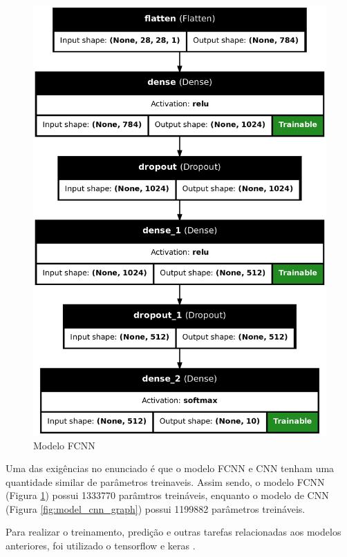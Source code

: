 \documentclass[12pt]{article}
\begin{document}
\begin{figure}[H]
\begin{minipage}{0.4\textwidth}
    \includegraphics[width=\textwidth]{../images/models/model_fcnn_graph.png}
    \caption{Modelo FCNN}
    \label{fig:model_fcnn_graph}
  \end{minipage}
\end{figure}

Uma das exigências no enunciado é que o modelo FCNN e CNN tenham uma quantidade similar de parâmetros treinaveis. Assim sendo, o modelo FCNN (Figura \ref{fig:model_fcnn_graph}) possui 1333770 parâmtros treináveis, enquanto o modelo de CNN (Figura \ref{fig:model_cnn_graph}) possui 1199882 parâmetros treináveis.


Para realizar o treinamento, predição e outras tarefas relacionadas aos modelos anteriores, foi utilizado o tensorflow \cite{tensorflow2015-whitepaper} e keras \cite{chollet2015keras}.
\end{document}
